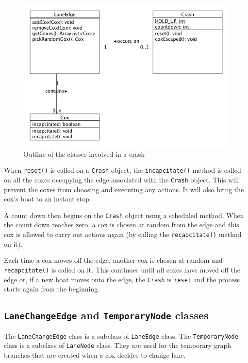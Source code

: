 \begin{figure}
\begin{center}
  \includegraphics[scale=0.5]{images/crashing.png}
  \caption{Outline of the classes involved in a crash}
  \label{software:fig:crashingUML}
\end{center}
\end{figure}


When \texttt{reset()} is called on a \texttt{Crash} object, the
\texttt{incapcitate()} method is called on all the coxes
occupying the edge associated with the \texttt{Crash} object. This will prevent the
coxes from choosing and executing any actions. It will also bring the
cox's boat to an instant stop.

A count down then begins on the \texttt{Crash} object using a
scheduled method. When the count down reaches zero, a cox is chosen at
random from the edge and this cox is allowed to carry out actions
again (by calling the \texttt{recapcitate()} method on it).

Each time a cox moves off the edge, another cox is chosen at
random and \texttt{recapcitate()} is called on it. This continues
until all coxes have moved off the edge or, if a new boat moves onto
the edge, the \texttt{Crash} is \texttt{reset} and the process starts
again from the beginning.

\subsection{\texttt{LaneChangeEdge} and \texttt{TemporaryNode} classes}\label{software:lane:lanechange}

The \texttt{LaneChangeEdge} class is a subclass of \texttt{LaneEdge} class. The
\texttt{TemporaryNode} class is a subclass of \texttt{LaneNode} class. They are used
for the temporary graph branches that are created when a cox decides
to change lane.

